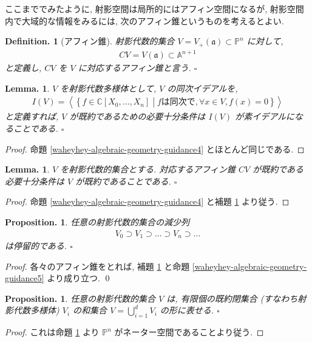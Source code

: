 \documentclass[openany, a4paper, oneside]{jsbook}
\theoremstyle{break}
\newtheorem{lem}[thm]{Lemma.}
\newtheorem{prop}[thm]{Proposition.}
\theoremstyle{breakdefn}
\newtheorem{defn}[thm]{Definition.}
\newcommand{\dbk}[1]{\left\langle #1 \right\rangle}
\newcommand{\relmiddle}[1]{\mathrel{}\middle#1\mathrel{}}
\newcommand{\set}[2]{\left\{#1 \relmiddle| #2\right\}}
\newcommand{\fin}{\hfill $\square$ \par}
\begin{document}
ここまででみたように, 射影空間は局所的にはアフィン空間になるが,
射影空間内で大域的な情報をみるには, 次のアフィン錐というものを考えるとよい.
\begin{defn}[アフィン錐]
射影代数的集合 $ V = V_+ ( \mathfrak{a} ) \subset \mathbb{P}^n $ に対して,
\begin{align}
 CV
 =
 V ( \mathfrak{a} )
 \subset
 \mathbb{A}^{n+1}
\end{align}
と定義し, $CV$ を $V$ に対応するアフィン錐と言う. \fin
\end{defn}
\begin{lem}\label{waheyhey-algebraic-geometry-guidance8}
$V$ を射影代数多様体として, $V$ の同次イデアルを,
\begin{align}
 I (V)
 =
 \dbk{\set{f \in \mathbb{C} [X_0, \dots , X_n]}{f \text{は同次で}, \forall x \in V , f (x)=0}}
\end{align}
と定義すれば, $V$ が既約であるための必要十分条件は $I (V)$ が素イデアルになることである. \fin
\end{lem}
\begin{proof}
命題 \ref{waheyhey-algebraic-geometry-guidance4} とほとんど同じである.
\end{proof}

\begin{lem}
 $V$ を射影代数的集合とする.
 対応するアフィン錐 $CV$ が既約である必要十分条件は $V$ が既約であることである. \fin
\label{lem1} \end{lem}
\begin{proof}
命題 \ref{waheyhey-algebraic-geometry-guidance4} と補題 \ref{waheyhey-algebraic-geometry-guidance8} より従う.
\end{proof}

\begin{prop}\label{waheyhey-algebraic-geometry-guidance9}
任意の射影代数的集合の減少列
\begin{align}
 V_0 \supset V_1 \supset \dots \supset V_n \supset \dots
\end{align}
は停留的である. \fin
\end{prop}
\begin{proof}
各々のアフィン錐をとれば, 補題 \ref{lem1} と命題 \ref{waheyhey-algebraic-geometry-guidance5} より成り立つ. \qed
\end{proof}

\begin{prop}\label{waheyhey-algebraic-geometry-guidance10}
任意の射影代数的集合 $V$ は, 有限個の既約閉集合 (すなわち射影代数多様体)
$V_i$ の和集合 $V = \bigcup_{ i = 1}^d V_i$ の形に表せる. \fin
\end{prop}
\begin{proof}
これは命題 \ref{waheyhey-algebraic-geometry-guidance9} より $\mathbb{P}^n$ がネーター空間であることより従う.
\end{proof}
\end{document}
